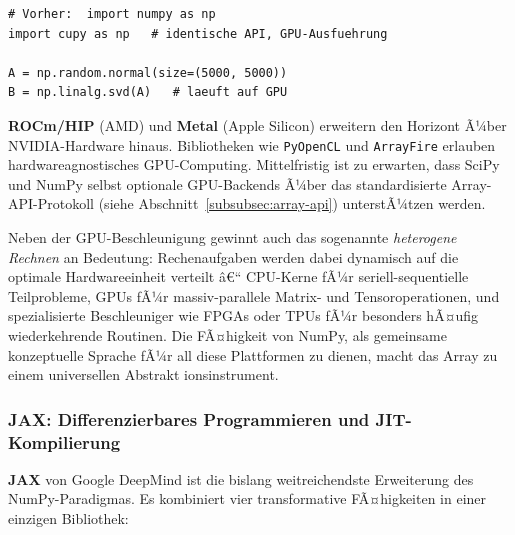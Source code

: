 \documentclass[12pt, a4paper]{article}
\begin{document}
\begin{lstlisting}[caption={CuPy als Drop-in-Ersatz fuer NumPy}]
# Vorher:  import numpy as np
import cupy as np   # identische API, GPU-Ausfuehrung

A = np.random.normal(size=(5000, 5000))
B = np.linalg.svd(A)   # laeuft auf GPU
\end{lstlisting}

\textbf{ROCm/HIP} (AMD) und \textbf{Metal} (Apple Silicon) erweitern
den Horizont Ã¼ber NVIDIA-Hardware hinaus. Bibliotheken wie
\texttt{PyOpenCL} und \texttt{ArrayFire} erlauben hardwareagnostisches
GPU-Computing. Mittelfristig ist zu erwarten, dass SciPy und NumPy selbst
optionale GPU-Backends Ã¼ber das standardisierte Array-API-Protokoll
(siehe Abschnitt~\ref{subsubsec:array-api}) unterstÃ¼tzen werden.

Neben der GPU-Beschleunigung gewinnt auch das sogenannte \emph{heterogene
Rechnen} an Bedeutung: Rechenaufgaben werden dabei dynamisch auf die
optimale Hardwareeinheit verteilt â€“ CPU-Kerne fÃ¼r seriell-sequentielle
Teilprobleme, GPUs fÃ¼r massiv-parallele Matrix- und Tensoroperationen,
und spezialisierte Beschleuniger wie FPGAs oder TPUs fÃ¼r besonders
hÃ¤ufig wiederkehrende Routinen. Die FÃ¤higkeit von NumPy, als gemeinsame
konzeptuelle Sprache fÃ¼r all diese Plattformen zu dienen, macht das Array
zu einem universellen Abstrakt ionsinstrument.

\subsubsection{JAX: Differenzierbares Programmieren und JIT-Kompilierung}
\label{subsubsec:jax}

\textbf{JAX} \cite{bradbury2018jax} von Google DeepMind ist die bislang
weitreichendste Erweiterung des NumPy-Paradigmas. Es kombiniert vier
transformative FÃ¤higkeiten in einer einzigen Bibliothek:
\end{document}
